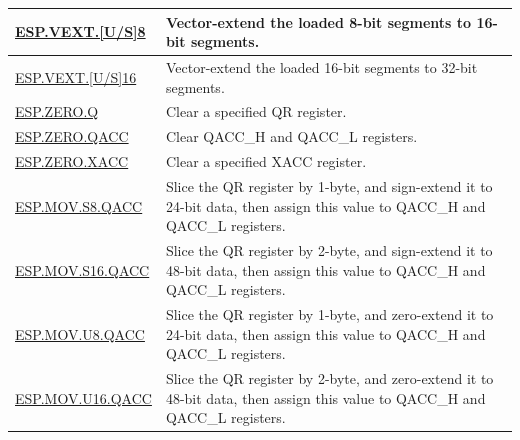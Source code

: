 \begin{longtable}[c]{|l|m{11cm}|}
    \\\hline
    \hyperref[instruction:ESPVEXTS8]{ESP.VEXT.[U/S]8} & Vector-extend the loaded 8-bit segments to 16-bit segments.
    \\\hline
    \hyperref[instruction:ESPVEXTS16]{ESP.VEXT.[U/S]16} & Vector-extend the loaded 16-bit segments to 32-bit segments.
    \\\hline
    \hyperref[instruction:ESPZEROQ]{ESP.ZERO.Q} & Clear a specified QR register.
    \\\hline
    \hyperref[instruction:ESPZEROQACC]{ESP.ZERO.QACC} & Clear QACC\_H and QACC\_L registers.
    \\\hline
    \hyperref[instruction:ESPZEROXACC]{ESP.ZERO.XACC} & Clear a specified XACC register.
    \\\hline
    \hyperref[instruction:ESPMOVS8QACC]{ESP.MOV.S8.QACC} & Slice the QR register by 1-byte, and sign-extend it to 24-bit data, then assign this value to QACC\_H and QACC\_L registers.
    \\\hline
    \hyperref[instruction:ESPMOVS16QACC]{ESP.MOV.S16.QACC} & Slice the QR register by 2-byte, and sign-extend it to 48-bit data, then assign this value to QACC\_H and QACC\_L registers.
    \\\hline
    \hyperref[instruction:ESPMOVU8QACC]{ESP.MOV.U8.QACC} & Slice the QR register by 1-byte, and zero-extend it to 24-bit data, then assign this value to QACC\_H and QACC\_L registers.
    \\\hline
    \hyperref[instruction:ESPMOVU16QACC]{ESP.MOV.U16.QACC} & Slice the QR register by 2-byte, and zero-extend it to 48-bit data, then assign this value to QACC\_H and QACC\_L registers.
    \\\hline
\end{longtable}

